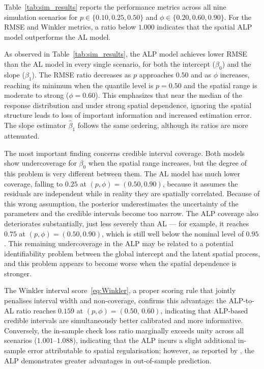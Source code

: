 \documentclass[twoside]{article}
\numberwithin{equation}{section}
\begin{document}
	Table~\ref{tab:sim_results} reports the performance metrics across all nine
	simulation scenarios for $p \in \{0.10, 0.25, 0.50\}$ and
	$\phi \in \{0.20, 0.60, 0.90\}$.
	For the RMSE and Winkler metrics, a ratio below $1.000$ indicates that
	the spatial ALP model outperforms the AL model.
	
	As observed in Table~\ref{tab:sim_results}, the ALP model achieves lower RMSE
	than the AL model in every single scenario, for both the intercept
	($\beta_0$) and the slope ($\beta_1$).
	The RMSE ratio decreases as $p$ approaches $0.50$ and as $\phi$ increases,
	reaching its minimum when the quantile level is $p = 0.50$ and the spatial
	range is moderate to strong ($\phi = 0.60$).
	This emphasizes that near the median of the response distribution and under
	strong spatial dependence, ignoring the spatial structure leads to loss of
	important information and increased estimation error.
	The slope estimator $\hat{\beta}_1$ follows the same ordering, although
	its ratios are more attenuated.
	
	The most important finding concerns credible interval coverage.
	Both models show undercoverage for $\beta_0$
	when the spatial range increases, but the degree of this problem is very different between them. The AL model has much lower coverage, falling to $0.25$
	at $(p, \phi) = (0.50, 0.90)$, because it assumes the residuals are independent while in reality they are spatially correlated. Because of this wrong assumption, the posterior underestimates the uncertainty of the parameters and the credible intervals become too narrow. The ALP coverage also deteriorates substantially, just less severely than AL — for example, it reaches $0.75$ at $(p, \phi) = (0.50, 0.90)$, which is still well below the nominal level of $0.95$. This remaining undercoverage in the ALP may be related to a potential identifiability problem between the global intercept and the latent spatial process, and this problem appears to become worse when the spatial dependence is stronger.
	
	The Winkler interval score~\eqref{eq:Winkler}, a proper scoring rule that
	jointly penalises interval width and non-coverage, confirms this advantage:
	the ALP-to-AL ratio reaches $0.159$ at $(p,\phi) = (0.50,\,0.60)$,
	indicating that ALP-based credible intervals are simultaneously better
	calibrated and more informative.
	Conversely, the in-sample check loss ratio marginally exceeds unity across
	all scenarios ($1.001$--$1.088$), indicating that the ALP incurs a slight
	additional in-sample error attributable to spatial regularisation; however,
	as reported by \citet{LumGelfand2012}, the ALP demonstrates greater
	advantages in out-of-sample prediction.
	
\end{document}
